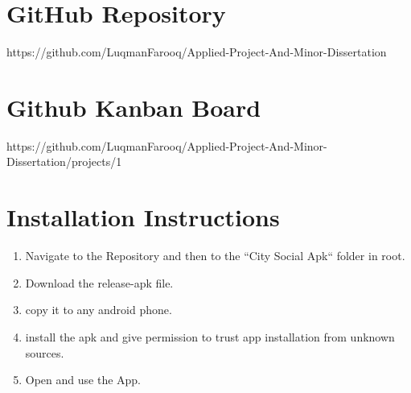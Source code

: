 \section{GitHub Repository}
https://github.com/LuqmanFarooq/Applied-Project-And-Minor-Dissertation

\section{Github Kanban Board}
https://github.com/LuqmanFarooq/Applied-Project-And-Minor-Dissertation/projects/1

\section{Installation Instructions}
\begin{enumerate}
    \item Navigate to the Repository and then to the ``City Social Apk`` folder in root.
    \item Download the release-apk file.
    \item copy it to any android phone.
    \item install the apk and give permission to trust app installation from unknown sources.
    \item Open and use the App.
\end{enumerate}
\printbibliography